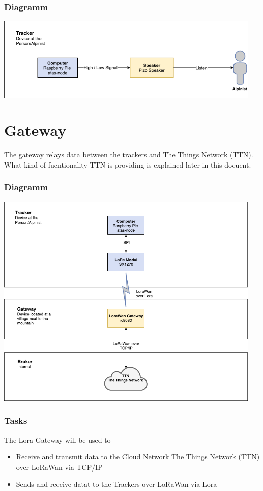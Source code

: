 \documentclass[a4paper,11pt, oneside]{report}
\theoremstyle{definition}
\begin{document}
\subsubsection{Diagramm}
\includegraphics[width=0.95\textwidth]{img/ATAS_SystemOverview_Detail_Sound.png}

\newpage
\section{Gateway}
The gateway relays data between the trackers and The Things Network (TTN). What kind of fucntionality TTN is providing is explained later in this docuent.

\subsubsection{Diagramm}
\includegraphics[width=0.95\textwidth]{img/ATAS_SystemOverview_Detail_Gateway.png}

\subsubsection{Tasks}
The Lora Gateway will be used to
\begin{itemize}
\item Receive and transmit data to the Cloud Network The Things Network (TTN) over LoRaWan via TCP/IP
\item Sends and receive datat to the Trackers over LoRaWan via Lora
\end{itemize}
\end{document}
